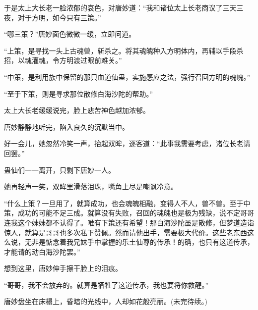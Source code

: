 \begin{this_body}
于是太上大长老一脸浓郁的哀色，对唐妙道：“我和诸位太上长老商议了三天三夜，对于方明，如今只有三策。”

“哪三策？”唐妙面色微微一缓，立即问道。

“上策，是寻找一头上古魂兽，斩杀之。将其魂魄种入方明体内，再辅以手段杀招，以魂灌魂，令方明渡过眼前难关。”

“中策，是利用族中保留的那只血道仙蛊，实施感应之法，强行召回方明的魂魄。”

“至于下策，则是寻求那位散修白海沙陀的帮助。”

太上大长老缓缓说完，脸上悲苦神色越加浓郁。

唐妙静静地听完，陷入良久的沉默当中。

好一会儿，她忽然冷笑一声，抬起双眸，逐客道：“此事我需要考虑，诸位长老请回罢。”

蛊仙们一一离开，只剩下唐妙一人。

她再轻声一笑，双眸里滑落泪珠，嘴角上尽是嘲讽冷意。

“什么上策？一旦用了，就算成功，也会魂魄相融，变得人不人，兽不兽。至于中策，成功的可能不足三成。就算没有失败，召回的魂魄也是极为残缺，说不定哥哥连我这个妹妹都不认得了。唯有下策还有希望！那白海沙陀虽是散修，但梦道造诣惊人，就算是哥哥也多次私下赞佩。然而请他出手，需要极大代价。这些老东西这么说，无非是惦念着我兄妹手中掌握的乐土仙尊的传承！的确，也只有这道传承，才能请的动白海沙陀罢。”

想到这里，唐妙伸手擦干脸上的泪痕。

“哥哥，我不会放弃的。就算是牺牲了这道传承，我也要将你救醒。”

唐妙盘坐在床榻上，昏暗的光线中，人却如花般亮丽。(未完待续。)

\end{this_body}

